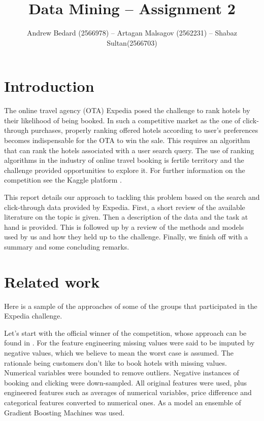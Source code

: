 \documentclass{llncs}
\title{Data Mining -- Assignment 2}
\author{Andrew Bedard (2566978) -- Artagan Malsagov (2562231)  -- Shabaz Sultan(2566703)}
\institute{}
\begin{document}
\maketitle
\section{Introduction}
The online travel agency (OTA) Expedia posed the challenge to rank hotels by their likelihood of being booked. In such a competitive market as the one of click-through purchases, properly ranking offered hotels according to user's preferences becomes indispensable for the OTA to win the sale. This requires an algorithm that can rank the hotels associated with a user search query. The use of ranking algorithms in the industry of online travel booking is fertile territory and the challenge provided opportunities to explore it. For further information on the competition see the Kaggle platform \cite{WinNT}.

This report details our approach to tackling this problem based on the search and click-through data provided by Expedia. First, a short review of the available literature on the topic is given. Then a description of the data and the task at hand is provided. This is followed up by a review of the methods and models used by us and how they held up to the challenge. Finally, we finish off with a summary and some concluding remarks.  

\section{Related work}
Here is a sample of the approaches of some of the groups that participated in the Expedia challenge. 

Let's start with the official winner of the competition, whose approach can be found in \cite{Zhang2013}. For the feature engineering missing values were said to be imputed by negative values, which we believe to mean the worst case is assumed. The rationale being customers don't like to book hotels with missing values. Numerical variables were bounded to remove outliers. Negative instances of booking and clicking were down-sampled. All original features were used, plus engineered features such as averages of numerical variables, price difference and categorical features converted to numerical ones. As a model an ensemble of Gradient Boosting Machines was used. 
\end{document}
